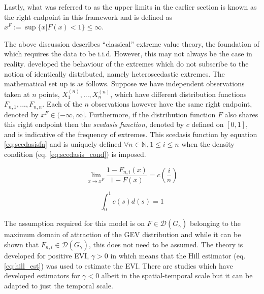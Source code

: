 \documentclass[a4paper]{article}
\begin{document}
Lastly, what was referred to as the upper limits in the earlier section is known as the right endpoint in this framework and is defined as $x^F := \sup\{x | F(x) < 1\} \le \infty$.

The above discussion describes ``classical'' extreme value theory, the foundation of which requires the data to be i.i.d. However, this may not always be the case in reality. \cite{einmahl16} developed the behaviour of the extremes which do not subscribe to the notion of identically distributed, namely heteroscedastic extremes. The mathematical set up is as follows. Suppose we have independent observations taken at $n$ points, $X_1^{(n)} , ... , X_n^{(n)}$, which have different distribution functions $F_{n,1}, ... , F_{n,n}$. Each of the $n$ observations however have the same right endpoint, denoted by $x^F \in (-\infty, \infty]$. Furthermore, if the distribution function $F$ also shares this right endpoint then the \textit{scedasis function}, denoted by $c$ defined on $[0,1]$, and is indicative of the frequency of extremes. This scedasis function by equation \ref{eq:scedasisfn} and is uniquely defined $\forall n \in \mathbb{N}, 1 \le i \le n$ when the density condition (eq. \ref{eq:scedasis_cond}) is imposed.


\begin{equation} \label{eq:scedasisfn}
\lim_{x \rightarrow x^F} \frac{1-F_{n,i}(x)}{1 - F(x)} = c(\frac{i}{n})
\end{equation}

\begin{equation} \label{eq:scedasis_cond}
\int_0^1 c(s)d(s) = 1
\end{equation}

The assumption required for this model is on $F  \in \mathcal{D}(G_{\gamma})$ belonging to the maximum domain of attraction of the GEV distribution and while it can be shown that $F_{n,i}  \in \mathcal{D}(G_{\gamma})$, this does not need to be assumed. The theory is developed for positive EVI, $\gamma > 0 $ in \citet{einmahl16} which means that the Hill estimator (eq. \ref{eq:hill_est}) was used to estimate the EVI. There are studies \citep{Ferreira17} which have developed estimators for $\gamma < 0$ albeit in the spatial-temporal scale but it can be adapted to just the temporal scale.
\end{document}
